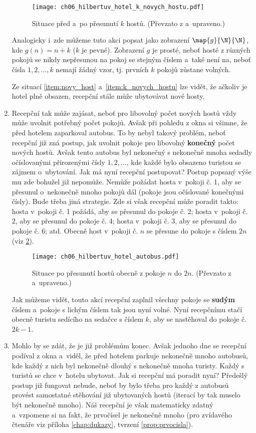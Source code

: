 \begin{enumerate}[label=\textit{(\roman*)}]
    \begin{figure}[h]
        \centering
        \texttt{[image: ch06\_hilbertuv\_hotel\_k\_novych\_hostu.pdf]}
        \caption{Situace před a~po přesunutí $k$ hostů. (Převzato z \cite{Rmoutil2022} a~upraveno.)}
        \label{fig:hilbertuv_hotel_k_novych_hostu}
    \end{figure}
    Analogicky i~zde můžeme tuto akci popsat jako zobrazení $\map{g}{\N}{\N}$, kde $g(n)=n+k$ ($k$ je pevné). Zobrazení $g$ je prosté, neboť hosté z různých pokojů se nikdy nepřesunou na pokoj se stejným číslem a~také není na, neboť čísla $1,2,\dots,k$ nemají žádný vzor, tj. prvních $k$ pokojů zůstane volných.\par
    Ze situací \ref{item:novy_host} a~\ref{item:k_novych_hostu} lze vidět, že ačkoliv je hotel plně obsazen, recepční stále může ubytovávat nové hosty.
    \item Recepční tak může zajásat, neboť pro libovolný počet nových hostů vždy může uvolnit potřebný počet pokojů. Avšak při pohledu z okna si všimne, že před hotelem zaparkoval autobus. To by nebyl takový problém, neboť recepční již zná postup, jak uvolnit pokoje pro libovolný \textbf{konečný} počet nových hostů. Avšak tento autobus byl nekonečný s nekonečně mnoha sedadly očíslovanými přirozenými čísly $1,2,\dots$, kde každé bylo obsazeno turistou se zájmem o~ubytování. Jak má nyní recepční postupovat? Postup popsaný výše mu zde bohužel již nepomůže. Nemůže požádat hosta v~pokoji č. 1, aby se přesunul o~nekonečně mnoho pokojů dál (pokoje jsou očíslované konečnými čísly). Bude třeba jiná strategie. Zde si však recepční může poradit takto: hosta v~pokoji č. 1 požádá, aby se přesunul do pokoje č. 2; hosta v~pokoji č. 2, aby se přesunul do pokoje č. 4; hosta v~pokoji č. 3, aby se přesunul do pokoje č. 6; atd. Obecně host v~pokoji č. $n$ se přesune do pokoje s číslem $2n$ (viz \ref{fig:hilbertuv_hotel_autobus}).
    \begin{figure}[h]
        \centering
        \texttt{[image: ch06\_hilbertuv\_hotel\_autobus.pdf]}
        \caption{Situace po přesunutí hostů obecně z pokoje $n$ do $2n$. (Převzato z \cite{Rmoutil2022} a~upraveno.)}
        \label{fig:hilbertuv_hotel_autobus}
    \end{figure}
    Jak můžeme vidět, touto akcí recepční zaplnil všechny pokoje se \textbf{sudým} číslem a~pokoje s lichým číslem tak jsou nyní volné. Nyní recepčnímu stačí obecně turistu sedícího na sedačce s číslem $k$, aby se nastěhoval do pokoje č. $2k-1$.
    \item Mohlo by se zdát, že je již problémům konec. Avšak jednoho dne se recepční podíval z okna a~viděl, že před hotelem parkuje nekonečně mnoho autobusů, kde každý z nich byl nekonečně dlouhý s nekonečně mnoha turisty. Každý s turistů se chce v~hotelu ubytovat. Jak si recepční má poradit nyní? Předešlý postup již fungovat nebude, neboť by bylo třeba pro každý z autobusů provést samostatné stěhování již ubytovaných hostů (iterací by tak muselo být nekonečně mnoho). Náš recepční je však matematicky zdatný a~vzpomene si na fakt, že prvočísel je nekonečně mnoho (pro zvídavého čtenáře viz příloha \ref{chap:dukazy}, tvrzení \ref{prop:prvocisla}).

\end{enumerate}
